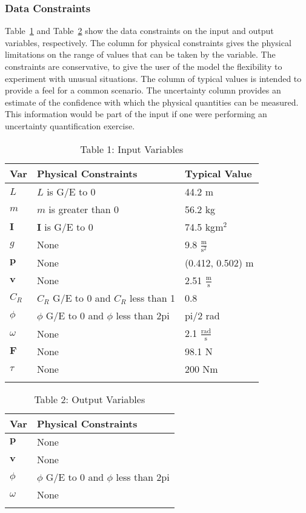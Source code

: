 \documentclass[12pt]{article}
\begin{document}
\subsubsection{Data Constraints}
\label{Sec:DataCons}
Table~\ref{Table:Tabl1:InpuVari} and Table~\ref{Table:Tabl2:OutpVari} show the data constraints on the input and output variables, respectively. The column for physical constraints gives the physical limitations on the range of values that can be taken by the variable. The constraints are conservative, to give the user of the model the flexibility to experiment with unusual situations. The column of typical values is intended to provide a feel for a common scenario. The uncertainty column provides an estimate of the confidence with which the physical quantities can be measured. This information would be part of the input if one were performing an uncertainty quantification exercise.
\begin{longtable}{l l l}
\toprule
Var & Physical Constraints & Typical Value
\\
\midrule
$L$ & $L$ is G/E to 0 & 44.2 m
\\
$m$ & $m$ is greater than 0 & 56.2 kg
\\
$\mathbf{I}$ & $\mathbf{I}$ is G/E to 0 & 74.5 kg$\text{m}^{2}$
\\
$g$ & None & 9.8 $\frac{\text{m}}{\text{s}^{2}}$
\\
$\mathbf{p}$ & None & (0.412, 0.502) m
\\
$\mathbf{v}$ & None & 2.51 $\frac{\text{m}}{\text{s}}$
\\
$C_{R}$ & $C_{R}$ G/E to 0 and $C_{R}$ less than 1 & 0.8
\\
$\phi{}$ & $\phi{}$ G/E to 0 and $\phi{}$ less than 2pi & pi/2 rad
\\
$\omega{}$ & None & 2.1 $\frac{\text{rad}}{\text{s}}$
\\
$\mathbf{F}$ & None & 98.1 N
\\
$\tau{}$ & None & 200 Nm
\\
\bottomrule
\caption{Table 1: Input Variables}
\label{Table:Tabl1:InpuVari}
\end{longtable}
\begin{longtable}{l l}
\toprule
Var & Physical Constraints
\\
\midrule
$\mathbf{p}$ & None
\\
$\mathbf{v}$ & None
\\
$\phi{}$ & $\phi{}$ G/E to 0 and $\phi{}$ less than 2pi
\\
$\omega{}$ & None
\\
\bottomrule
\caption{Table 2: Output Variables}
\label{Table:Tabl2:OutpVari}
\end{longtable}
\end{document}
